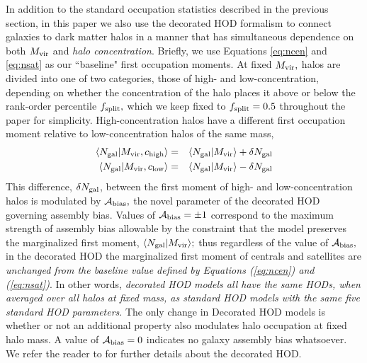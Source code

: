\documentclass[usenatbib,usegraphicx,letterpaper]{mn2e}
\newcommand{\mvir}{M_{\rm vir}}
\newcommand{\ngal}{N_{\rm gal}}
\newcommand{\abias}{\mathcal{A}_{\rm bias}}
\begin{document}
In addition to the standard occupation statistics described in the
previous section, in this paper we also use the decorated HOD
formalism to connect galaxies to dark matter halos in a manner that
has simultaneous dependence on both $\mvir$ and {\em halo concentration}.
Briefly, we use Equations \ref{eq:ncen} and \ref{eq:nsat} as our
``baseline" first occupation moments.  At fixed $\mvir,$ halos are
divided into one of two categories, those of high- and
low-concentration, depending on whether the concentration of the halo
places it above or below the rank-order percentile $f_{\rm split},$
which we keep fixed to $f_{\rm split}=0.5$ throughout the paper for
simplicity. High-concentration halos have a different first
occupation moment relative to low-concentration halos of the same
mass,
%
\begin{eqnarray}
\langle\ngal|\mvir, c_{\rm high}\rangle & = & \langle\ngal|\mvir \rangle + \delta\ngal \nonumber \\  
\langle\ngal|\mvir, c_{\rm low}\rangle  & = & \langle\ngal|\mvir \rangle - \delta\ngal
\end{eqnarray}
%
This difference, $\delta\ngal$, between the
first moment of high- and low-concentration halos is modulated by
$\abias,$ the novel parameter of the decorated HOD governing assembly
bias. Values of $\abias=\pm1$ correspond to the maximum strength of
assembly bias allowable by the constraint that the model preserves the
marginalized first moment, $\langle\ngal|\mvir\rangle;$ thus
regardless of the value of $\abias,$ in the decorated HOD the
marginalized first moment of centrals and satellites are {\em 
unchanged from the baseline value defined by Equations (\ref{eq:ncen}) 
and (\ref{eq:nsat})}. In other words, {\em decorated HOD models all have the same HODs,
when averaged over all halos at fixed mass, as standard HOD
models with the same five standard HOD parameters}. 
The only change in Decorated HOD models is whether or not an
additional property also modulates halo occupation at fixed halo
mass. A value of $\abias = 0$ indicates no galaxy assembly bias
whatsoever. We refer the reader to \citet{hearin_etal16} for further
details about the decorated HOD.
\end{document}
